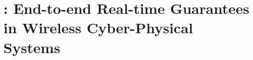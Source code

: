 
\pagestyle{headings}
\chapter[\DRP~-- Distributed Real-time Protocol]{\DRP: End-to-end Real-time Guarantees in Wireless Cyber-Physical Systems}
\label{ch:drp}

\renewcommand{\ChapPath}{40_DRP}
\renewcommand{\PathTab}{\ChapPath/Tables}














\begin{subappendices}

\newpage


\newpage



\end{subappendices}

